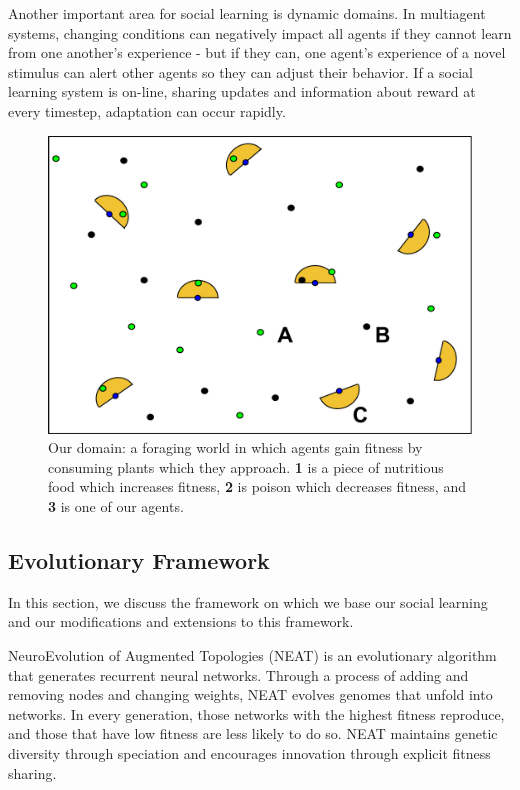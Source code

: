\documentclass{acm_proc_article-sp}
\begin{document}
Another important area for social learning is dynamic domains. In multiagent systems, changing conditions can negatively impact all agents if they cannot learn from one another's experience - but if they can, one agent's experience of a novel stimulus can alert other agents so they can adjust their behavior. If a social learning system is on-line, sharing updates and information about reward at every timestep, adaptation can occur rapidly.

\begin{figure}
  \centering
    \includegraphics[scale=.3]{world.pdf}
  \caption{Our domain: a foraging world in which agents gain fitness by consuming plants which they approach.  \textbf{1} is a piece of nutritious food which increases fitness, \textbf{2} is poison which decreases fitness, and \textbf{3} is one of our agents.}
  \label{fig:darwin-lamark}
\end{figure}

\subsection*{Evolutionary Framework}
In this section, we discuss the framework on which we base our social learning and our modifications and extensions to this framework.

NeuroEvolution of Augmented Topologies (NEAT)\cite{stanley2002evolving} is an evolutionary algorithm that generates recurrent neural networks. Through a process of adding and removing nodes and changing weights, NEAT evolves genomes that unfold into networks. In every generation, those networks with the highest fitness reproduce, and those that have low fitness are less likely to do so. NEAT maintains genetic diversity through speciation and encourages innovation through explicit fitness sharing.
\end{document}
